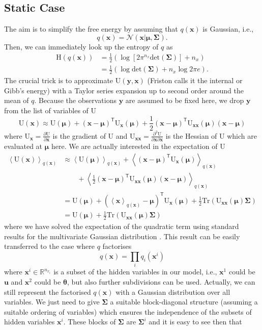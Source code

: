 \documentclass[a4paper,10pt]{article}
\newcommand{\bs}[1]{\mathbf{#1}}					%
\newcommand{\bgs}[1]{\boldsymbol{#1}}				%
\newcommand{\pd}[2]{\frac{\partial #1}{\partial #2}} 	%
\newcommand{\ppd}[3]{\frac{\partial^2 #1}{\partial #2 \partial #3}} %
\newcommand{\tr}{\mathsf{T}}				%
\newcommand{\eq}[1]{\begin{equation} #1 \end{equation}}%
\newcommand{\trace}[1]{\mathrm{Tr}\left(#1\right)}					%
\renewcommand{\ss}{u}         %
\newcommand{\so}{y}         %
\newcommand{\sh}{x}         %
\renewcommand{\sp}{\theta}    %
\newcommand{\ps}{\bs{\ss}}    %
\newcommand{\po}{\bs{\so}}    %
\newcommand{\ph}{\bs{\sh}}    %
\newcommand{\pp}{\bgs{\sp}} %
\newcommand{\E}[2][]{\left\langle #2 \right\rangle_{#1}}	%
\newcommand{\Ent}{\mathrm{H}}			%
\newcommand{\U}{\mathrm{U}}			%
\newcommand{\N}{\mathcal{N}}			%
\newcommand{\R}{\mathbb{R}}				%
\newcommand{\Cov}{\bgs{\Sigma}}			%
\renewcommand{\det}[1]{\mathrm{det}(#1)}	%
\begin{document}
\subsection{Static Case}
The aim is to simplify the free energy by assuming that $q(\ph)$ is Gaussian, i.e.,
\eq{
    q(\ph) = \N(\ph|\bgs{\mu},\Cov).
}
Then, we can immediately look up the entropy of $q$ \citep[][eq. (366)]{Petersen2008} as
\eq{\begin{split}
    \Ent(q(\ph)) &= \frac{1}{2} \left(\log [2\pi^{n_\sh} \det{\Cov}] + n_\sh\right) \\
                 &= \frac{1}{2} \left(\log \det{\Cov} + n_\sh \log 2\pi e\right).
\end{split}}
The crucial trick is to approximate $\U(\po,\ph)$ (Friston calls it the internal or Gibb's energy) with a Taylor series expansion up to second order around the mean of $q$. Because the observations $\po$ are assumed to be fixed here, we drop $\po$ from the list of variables of $\U$
\eq{
    \U(\ph) \approx \U(\bgs{\mu}) + (\ph - \bgs{\mu})^\tr \U_\ph(\bgs{\mu}) + \frac{1}{2}(\ph - \bgs{\mu})^\tr \U_{\ph\ph}(\bgs{\mu}) (\ph - \bgs{\mu})
}
where $\U_\ph = \pd{\U}{\ph}$ is the gradient of $\U$ and $\U_{\ph\ph} = \ppd{\U}{\ph}{\ph}$ is the Hessian of $\U$ which are evaluated at $\bgs{\mu}$ here. We are actually interested in the expectation of $\U$
\begin{align}
    \E[q(\ph)]{\U(\ph)} &\approx 
            \E[q(\ph)]{\U(\bgs{\mu})} + \E[q(\ph)]{(\ph - \bgs{\mu})^\tr \U_\ph(\bgs{\mu})}\nonumber\\
               & \qquad + \E[q(\ph)]{\frac{1}{2}(\ph - \bgs{\mu})^\tr \U_{\ph\ph}(\bgs{\mu}) (\ph - \bgs{\mu})}\\
        &= \U(\bgs{\mu}) + \left(\E[q(\ph)]{\ph} - \bgs{\mu}\right)^\tr \U_\ph(\bgs{\mu}) + \frac{1}{2}\trace{\U_{\ph\ph}(\bgs{\mu})\Cov}\\
        &= \U(\bgs{\mu}) + \frac{1}{2}\trace{\U_{\ph\ph}(\bgs{\mu})\Cov}
\end{align}
where we have solved the expectation of the quadratic term using standard results for the multivariate Gaussian distribution \citep[][eq. (357)]{Petersen2008}. This result can be easily transferred to the case where $q$ factorises
\eq{
    q(\ph) = \prod_i q_i(\ph^i)
}
where $\ph^i \in \R^{n_{\sh_i}}$ is a subset of the hidden variables in our model, i.e., $\ph^1$ could be $\ps$ and $\ph^2$ could be $\pp$, but also further subdivisions can be used. Actually, we can still represent the factorised $q(\ph)$ with a Gaussian distribution over all variables. We just need to give $\Cov$ a suitable block-diagonal structure (assuming a suitable ordering of variables) which ensures the independence of the subsets of hidden variables $\ph^i$. These blocks of $\Cov$ are $\Cov^i$ and it is easy to see then that
\end{document}
